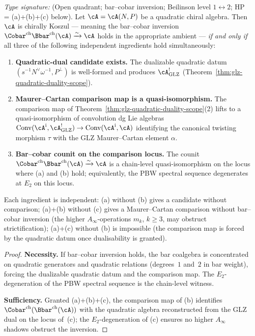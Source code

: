 \begin{theorem}
\label{thm:full-koszulness-separate}
\emph{Type signature:} (Open quadrant; bar--cobar inversion;
Beilinson level $1\!\leftrightarrow\!2$; HP = (a)+(b)+(c) below).
Let $\cA = \cA(N,P)$ be a quadratic chiral algebra. Then $\cA$ is
chirally Koszul — meaning the bar--cobar inversion
$\Cobar^{\mathrm{ch}}\Bbar^{\mathrm{ch}}(\cA) \xrightarrow{\sim} \cA$
holds in the appropriate ambient — \emph{if and only if} all three
of the following independent ingredients hold simultaneously:
\begin{enumerate}[label=\textup{(\alph*)}]
\item \textbf{Quadratic-dual candidate exists.} The dualizable
quadratic datum $(s^{-1}N^\vee\omega^{-1}, P^\perp)$ is well-formed
and produces $\cA^!_{\mathrm{GLZ}}$
(Theorem~\ref{thm:glz-quadratic-duality-scope}).

\item \textbf{Maurer--Cartan comparison map is a quasi-isomorphism.}
The comparison map of
Theorem~\ref{thm:glz-quadratic-duality-scope}(2) lifts to a
quasi-isomorphism of convolution dg Lie algebras
$\operatorname{Conv}(\cA^{\mathrm i}, \cA^!_{\mathrm{GLZ}}) \to
\operatorname{Conv}(\cA^{\mathrm i}, \cA)$ identifying the
canonical twisting morphism $\tau$ with the GLZ Maurer--Cartan
element $\alpha$.

\item \textbf{Bar--cobar counit on the comparison
locus.} The counit $\Cobar^{\mathrm{ch}}\Bbar^{\mathrm{ch}}(\cA)
\xrightarrow{\sim} \cA$ is a chain-level quasi-isomorphism on the
locus where (a) and (b) hold; equivalently, the PBW spectral sequence
degenerates at $E_2$ on this locus.
\end{enumerate}
Each ingredient is independent: (a) without (b) gives a candidate
without comparison; (a)+(b) without (c) gives a Maurer--Cartan
comparison without bar--cobar inversion (the higher
$A_\infty$-operations $m_k$, $k\ge 3$, may obstruct
strictification); (a)+(c) without (b) is impossible (the comparison
map is forced by the quadratic datum once dualisability is granted).
\end{theorem}

\begin{proof}
\textbf{Necessity.} If bar--cobar inversion holds, the bar coalgebra
is concentrated on quadratic generators and quadratic relations
(degrees~$1$ and~$2$ in bar weight), forcing the dualizable quadratic
datum and the comparison map. The $E_2$-degeneration of the PBW
spectral sequence is the chain-level witness.

\textbf{Sufficiency.} Granted (a)+(b)+(c), the comparison map of (b)
identifies $\Cobar^{\mathrm{ch}}(\Bbar^{\mathrm{ch}}(\cA))$ with the
quadratic algebra reconstructed from the GLZ dual on the locus
of~(c); the $E_2$-degeneration of (c) ensures no higher $A_\infty$
shadows obstruct the inversion.
\end{proof}


